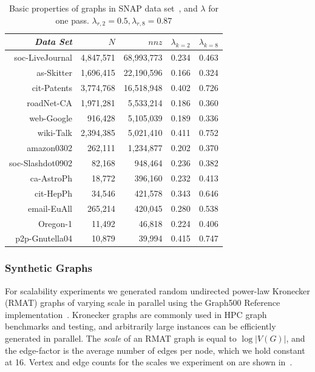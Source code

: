 \begin{table}
\caption{Basic properties of graphs in SNAP data set~\cite{Leskovec-data}, and $\lambda$ for one pass. $\lambda_{r,2}=0.5,\lambda_{r,8}=0.87$}
\centering
\small
{ \begin{tabular}{ *5r }    \toprule
\emph{Data Set} & $N$ & $nnz$  & $\lambda_{k=2}$ & $\lambda_{k=8}$ \\\midrule
soc-LiveJournal & 4,847,571 & 68,993,773  &0.234& 0.463\\
as-Skitter & 1,696,415 & 22,190,596  & 0.166&0.324\\
cit-Patents & 3,774,768 & 16,518,948  & 0.402&0.726\\
roadNet-CA & 1,971,281 & 5,533,214  & 0.186&0.360\\
web-Google & 916,428 & 5,105,039  &0.189&0.336\\
wiki-Talk & 2,394,385 & 5,021,410 &0.411&0.752\\
amazon0302 & 262,111 & 1,234,877 & 0.202&0.370\\
soc-Slashdot0902 & 82,168 & 948,464  &0.236&0.382\\
ca-AstroPh & 18,772 & 396,160 & 0.232&0.413\\
cit-HepPh & 34,546 & 421,578 & 0.343&0.646\\
email-EuAll & 265,214 & 420,045 & 0.280&0.538\\
Oregon-1 & 11,492 & 46,818  & 0.224&0.406\\
p2p-Gnutella04 & 10,879 & 39,994  & 0.415&0.747\\
 \hline
\end{tabular}\par
}
\label{tab:rw}
\end{table}

\subsubsection{Synthetic Graphs}
For scalability experiments we generated random undirected power-law Kronecker (RMAT) graphs of varying scale in parallel using the Graph500 Reference implementation~\cite{graph500}. Kronecker graphs are commonly used in HPC graph benchmarks and testing, and arbitrarily large instances can be efficiently generated in parallel. The \emph{scale} of an RMAT graph is equal to $\log |V(G)|$, and the edge-factor is the average number of edges per node, which we hold constant at 16. Vertex and edge counts for the scales we experiment on are shown in~.

